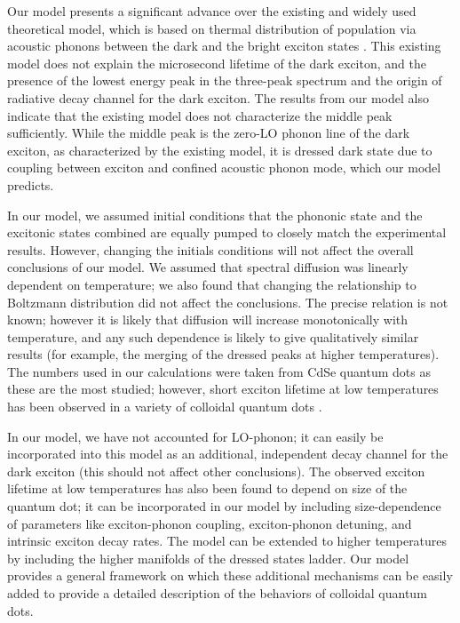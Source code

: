 \documentclass[aps,pra,preprint,groupedaddress]{revtex4-1}
\begin{document}
Our model presents a significant advance over the existing and widely used theoretical model, which is based on thermal distribution of population via acoustic phonons between the dark and the bright exciton states \cite{Labeau2003,Crooker2003,DeMelloDonega2006,Oron2009,Biadala2009,Brovelli2011, Eilers2014,Biadala2016,Werschler2016}. This existing model does not explain the microsecond lifetime of the dark exciton, and the presence of the lowest energy peak in the three-peak spectrum and the origin of radiative decay channel for the dark exciton. The results from our model also indicate that the existing model does not characterize the middle peak sufficiently. While the middle peak is the zero-LO phonon line of the dark exciton, as characterized by the existing model, it is dressed dark state due to coupling between exciton and confined acoustic phonon mode, which our model predicts. 

In our model, we assumed initial conditions that the phononic state and the excitonic states combined are equally pumped to closely match the experimental results. However, changing the initials conditions will not affect the overall conclusions of our model. We assumed that spectral diffusion was linearly dependent on temperature; we also found that changing the relationship to Boltzmann distribution did not affect the conclusions. The precise relation is not known; however it is likely that diffusion will increase monotonically with temperature, and any such dependence is likely to give qualitatively similar results (for example, the merging of the dressed peaks at higher temperatures). The numbers used in our calculations were taken from CdSe quantum dots as these are the most studied; however, short exciton lifetime at low temperatures has been observed in a variety of colloidal quantum dots \cite{Crooker2003,Oron2009,Eilers2014,Biadala2016,Robel2015}.

In our model, we have not accounted for LO-phonon; it can easily be incorporated into this model as an additional, independent decay channel for the dark exciton (this should not affect other conclusions). The observed exciton lifetime at low temperatures has also been found to depend on size of the quantum dot; it can be incorporated in our model by including size-dependence of parameters like exciton-phonon coupling, exciton-phonon detuning, and intrinsic exciton decay rates. The model can be extended to higher temperatures by including the higher manifolds of the dressed states ladder. Our model provides a general framework on which these additional mechanisms can be easily added to provide a detailed description of the behaviors of colloidal quantum dots.
\end{document}
